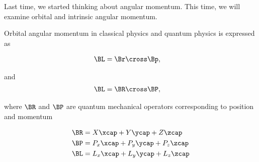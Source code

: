 %
%

Last time, we started thinking about angular momentum.  This time, we will examine orbital and intrinsic angular momentum.

Orbital angular momentum in classical physics and quantum physics is expressed as

\begin{align}\label{eqn:PHY356Foct19:1000}
\BL &= \Br \cross \Bp,
\end{align}

and
\begin{align}\label{eqn:PHY356Foct19:1001}
\BL &= \BR \cross \BP,
\end{align}

where $\BR$ and $\BP$ are quantum mechanical operators corresponding to position and momentum

\begin{align}\label{eqn:PHY356Foct19:1002}
\BR &= X \xcap + Y \ycap + Z \zcap \\
\BP &= P_x \xcap + P_y \ycap + P_z \zcap \\
\BL &= L_x \xcap + L_y \ycap + L_z \zcap
\end{align}

